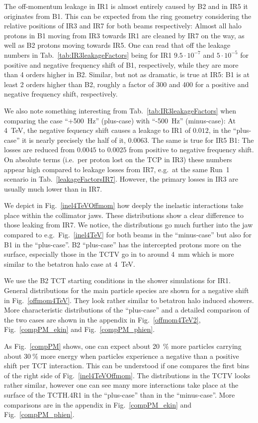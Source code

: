 The off-momentum leakage in IR1 is almost entirely caused by B2 and in IR5 it originates from B1. This can be expected from the ring geometry considering the relative positions of IR3 and IR7 for both beams respectively: Almost all halo protons in B1 moving from IR3 towards IR1 are cleaned by IR7 on the way, as well as B2 protons moving towards IR5. One can read that off the leakage numbers in Tab.~\ref{tab:IR3leakageFactors} being for IR1 $9.5 \cdot 10^{-7}$ and $5 \cdot 10^{-5}$ for positive and negative frequency shift of B1, respectively, while they are more than 4 orders higher in B2. Similar, but not as dramatic, is true at IR5: B1 is at least 2 orders higher than B2, roughly a factor of 300 and 400 for a positive and negative frequency shift, respectively.

We also note something interesting from Tab.~\ref{tab:IR3leakageFactors} when comparing the case ``+500~Hz'' (plus-case) with ``-500~Hz'' (minus-case): At 4~TeV, the negative fequency shift causes a leakage to IR1 of $0.012$, in the ``plus-case'' it is nearly precisely the half of it, $0.0063$. The same is true for IR5 B1: The losses are reduced from $0.0045$ to $0.0025$ from positive to negative frequency shift. On absolute terms (i.e.~per proton lost on the TCP in IR3) these numbers appear high compared to leakage losses from IR7, e.g.~at the same Run~1 scenario in Tab.~\ref{leakageFactorsIR7}. However, the primary losses in IR3 are usually much lower than in IR7.

We depict in Fig.~\ref{inel4TeVOffmom} how deeply the inelastic interactions take place within the collimator jaws. These distributions show a clear difference to those leaking from IR7. We notice, the distributions go much further into the jaw compared to e.g.~Fig.~\ref{inel4TeV} for both beams in the ``minus-case'' but also for B1 in the ``plus-case''. B2 ``plus-case'' has the intercepted protons more on the surface, especially those in the TCTV go in to around 4~mm which is more similar to the betatron halo case at 4~TeV. 

We use the B2 TCT starting conditions in the shower simulations for IR1. General distributions for the main particle species are shown for a negative shift in Fig.~\ref{offmom4TeV}. They look rather similar to betatron halo induced showers. More characteristic distributions of the ``plus-case'' and a detailed comparison of the two cases are shown in the appendix in Fig.~\ref{offmom4TeV2}, Fig.~\ref{compPM_ekin} and Fig.~\ref{compPM_phien}.

As Fig.~\ref{compPM} shows, one can expect about 20~$\%$ more particles carrying about 30$~\%$ more energy when particles experience a negative than a positive shift per TCT interaction. This can be understood if one compares the first bins of the right side of Fig.~\ref{inel4TeVOffmom}. The distributions in the TCTV looks rather similar, however one can see many more interactions take place at the surface of the TCTH.4R1 in the ``plus-case'' than in the ``minus-case''. More comparisons are in the appendix in Fig.~\ref{compPM_ekin} and Fig.~\ref{compPM_phien}.



